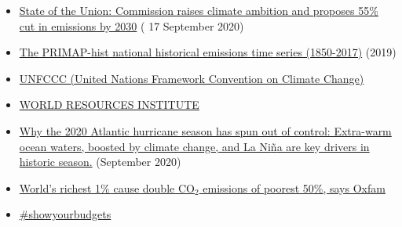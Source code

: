 \documentclass[12pt]{article}
\begin{document}
\begin{itemize}
 \vspace{-.2cm} \item \href{https://ec.europa.eu/commission/presscorner/detail/en/IP_20_1599}{State of the Union: Commission raises climate ambition and proposes 55\% cut in emissions by 2030} ( 17 September 2020)
 \vspace{-.2cm} \item \href{https://dataservices.gfz-potsdam.de/pik/showshort.php?id=escidoc:4736895}{The PRIMAP-hist national historical emissions time series (1850-2017)} (2019)
 \vspace{-.2cm} \item \href{https://unfccc.int/}{UNFCCC (United Nations Framework Convention on Climate Change)} 
 \vspace{-.2cm} \item \href{https://www.wri.org/}{WORLD RESOURCES INSTITUTE} 
 \vspace{-.2cm} \item \href{https://www.washingtonpost.com/weather/2020/09/23/atlantic-hurricanes-record-2020/?utm_campaign=Carbon%20Brief%20Daily%20Briefing&utm_medium=email&utm_source=Revue%20newsletter}{Why the 2020 Atlantic hurricane season has spun out of control: Extra-warm ocean waters, boosted by climate change, and La Ni{\~n}a are key drivers in historic season.} (September 2020)
 \vspace{-.2cm} \item \href{https://www.theguardian.com/environment/2020/sep/21/worlds-richest-1-cause-double-co2-emissions-of-poorest-50-says-oxfam?utm_campaign=Carbon%20Brief%20Daily%20Briefing&utm_medium=email&utm_source=Revue%20newsletter}{World's richest 1\% cause double CO$_2$ emissions of poorest 50\%, says Oxfam} 
 \vspace{-.2cm} \item \href{https://www.showyourbudgets.org/de/?country=whole_world}{\#showyourbudgets} 
 \end{itemize}

 
\end{document}
